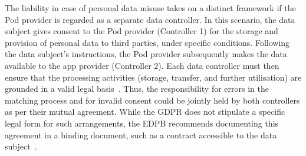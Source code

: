The liability in case of personal data misuse takes on a distinct framework if the Pod provider is regarded as a separate data controller.
In this scenario, the data subject gives consent to the Pod provider (Controller 1) for the storage and provision of personal data to third parties, under specific conditions.
Following the data subject's instructions, the Pod provider subsequently makes the data available to the app provider (Controller 2).
Each data controller must then ensure that the processing activities (storage, transfer, and further utilisation) are grounded in a valid legal basis~\citep{european_data_protection_board_guidelines_2020}.
Thus, the responsibility for errors in the matching process and for invalid consent could be jointly held by both controllers as per their mutual agreement.
While the GDPR does not stipulate a specific legal form for such arrangements, the EDPB recommends documenting this agreement in a binding document, such as a contract accessible to the data subject~\citep{european_data_protection_board_guidelines_2020}.
